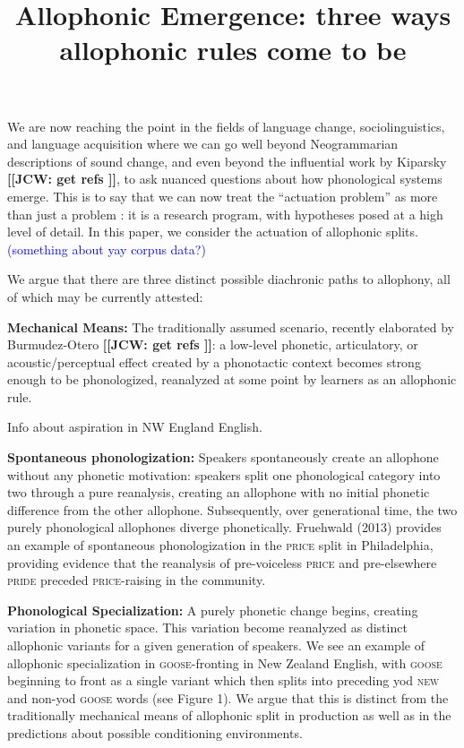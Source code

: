 \documentclass[10pt,letterpaper]{article}
\newcommand{\noteme}[1]{\noindent \textbf{[[JCW:  #1 ]]}}
\begin{document}
\title{Allophonic Emergence: three ways allophonic rules come to be}
\author{}
\date{}
\maketitle


We are now reaching the point in the fields of language change, sociolinguistics, and language acquisition where we can go well beyond Neogrammarian descriptions of sound change, and even beyond the influential work by Kiparsky \noteme{get refs}, to ask nuanced questions about how phonological systems emerge. This is to say that we can now treat the ``actuation problem'' as more than just a problem \citep{wlh1968}: it is a research program, with hypotheses posed at a high level of detail. In this paper, we consider the actuation of allophonic splits. \textcolor{blue}{(something about yay corpus data?)}

We argue that there are three distinct possible diachronic paths to allophony, all of which may be currently attested:

\textbf{Mechanical Means:} The traditionally assumed scenario, recently elaborated by Burmudez-Otero \noteme{get refs}: a low-level phonetic, articulatory, or acoustic/perceptual effect created by a phonotactic context becomes strong enough to be phonologized, reanalyzed at some point by learners as an allophonic rule. 

Info about aspiration in NW England English. 

\textbf{Spontaneous phonologization:} Speakers spontaneously create an allophone without any phonetic motivation: speakers split one phonological category into two through a pure reanalysis, creating an allophone with no initial phonetic difference from the other allophone. Subsequently, over generational time, the two purely phonological allophones diverge phonetically. Fruehwald (2013) provides an example of spontaneous phonologization in the \textsc{price} split in Philadelphia, providing evidence that the reanalysis of pre-voiceless \textsc{price} and pre-elsewhere \textsc{pride} preceded \textsc{price}-raising in the community.

\textbf{Phonological Specialization:} %
A purely phonetic change begins, creating variation in phonetic space. This variation become reanalyzed as distinct allophonic variants for a given generation of speakers. We see an example of allophonic specialization in \textsc{goose}-fronting in New Zealand English, with \textsc{goose} beginning to front as a single variant which then splits into preceding yod \textsc{new} and non-yod \textsc{goose} words (see Figure 1). We argue that this is distinct from the traditionally mechanical means of allophonic split in production as well as in the predictions about possible conditioning environments.
\end{document}
